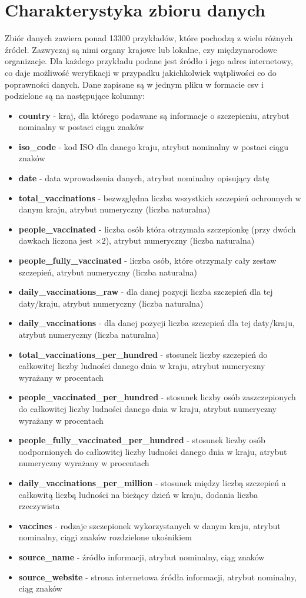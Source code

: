 \documentclass[12pt, oneside, openany]{article}
\begin{document}
\section{Charakterystyka zbioru danych}
Zbiór danych zawiera ponad 13300 przykładów, które pochodzą z wielu różnych źródeł. Zazwyczaj są nimi organy krajowe lub lokalne, czy międzynarodowe organizacje. Dla każdego przykładu podane jest źródło i jego adres internetowy, co daje możliwość weryfikacji w przypadku jakichkolwiek wątpliwości co do poprawności danych. Dane zapisane są w jednym pliku w formacie csv i podzielone są na następujące kolumny:
\begin{itemize}
\item \textbf{country} - kraj, dla którego podawane są informacje o szczepieniu, atrybut nominalny w postaci ciągu znaków
\item \textbf{iso\_code} - kod ISO dla danego kraju, atrybut nominalny w postaci ciągu znaków
\item \textbf{date} - data wprowadzenia danych, atrybut nominalny opisujący datę
\item \textbf{total\_vaccinations} - bezwzględna liczba wszystkich szczepień ochronnych w danym kraju, atrybut numeryczny (liczba naturalna)
\item \textbf{people\_vaccinated} - liczba osób która otrzymała szczepionkę (przy dwóch dawkach liczona jest $\times2$), atrybut numeryczny (liczba naturalna)
\item \textbf{people\_fully\_vaccinated} -  liczba osób, które otrzymały cały zestaw szczepień, atrybut numeryczny (liczba naturalna)
\item \textbf{daily\_vaccinations\_raw} - dla danej pozycji liczba szczepień dla tej daty/kraju, atrybut numeryczny (liczba naturalna)
\item \textbf{daily\_vaccinations} - dla danej pozycji liczba szczepień dla tej daty/kraju, atrybut numeryczny (liczba naturalna)
\item \textbf{total\_vaccinations\_per\_hundred} - stosunek liczby szczepień do całkowitej liczby ludności danego dnia w kraju, atrybut numeryczny wyrażany w procentach
\item \textbf{people\_vaccinated\_per\_hundred} - stosunek liczby osób zaszczepionych do całkowitej liczby ludności danego dnia w kraju, atrybut numeryczny wyrażany w procentach
\item \textbf{people\_fully\_vaccinated\_per\_hundred} - stosunek liczby osób uodpornionych do całkowitej liczby ludności danego dnia w kraju, atrybut numeryczny wyrażany w procentach
\item \textbf{daily\_vaccinations\_per\_million} - stosunek między liczbą szczepień a całkowitą liczbą ludności na bieżący dzień w kraju, dodania liczba rzeczywista
\item \textbf{vaccines} - rodzaje szczepionek wykorzystanych w danym kraju, atrybut nominalny, ciągi znaków rozdzielone ukośnikiem
\item \textbf{source\_name} - źródło informacji, atrybut nominalny, ciąg znaków
\item \textbf{source\_website} - strona internetowa źródła informacji, atrybut nominalny, ciąg znaków
\end{itemize}
\end{document}
